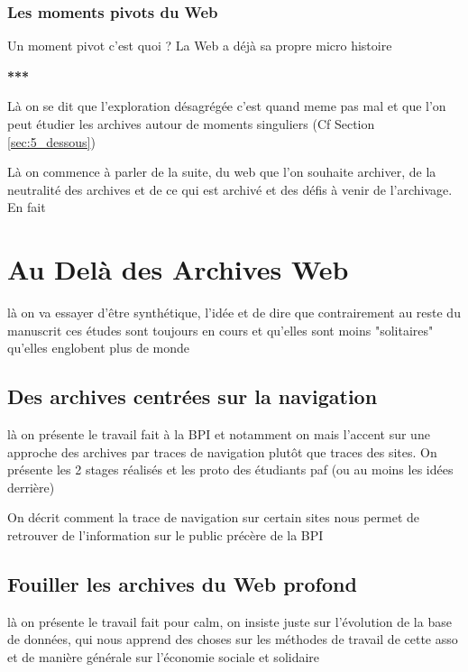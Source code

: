 \documentclass[symmetric,justified,marginals=raggedouter]{tufte-book}
\begin{document}
\subsection{Les moments pivots du Web}

\noindent Un moment pivot c'est quoi ? La Web a déjà sa propre micro histoire 

\begin{center}
	\textbf{***}
\end{center}

\noindent Là on se dit que l'exploration désagrégée c'est quand meme pas mal et que l'on peut étudier les archives autour de moments singuliers (Cf Section \ref{sec:5_dessous})

\noindent Là on commence à parler de la suite, du web que l'on souhaite archiver, de la neutralité des archives et de ce qui est archivé et des défis à venir de l'archivage. En fait 


\chapter{Au Delà des Archives Web}
\label{chap:7}

\noindent là on va essayer d'être synthétique, l'idée et de dire que contrairement au reste du manuscrit ces études sont toujours en cours et qu'elles sont moins "solitaires" qu'elles englobent plus de monde 

\section{Des archives centrées sur la navigation}

\noindent là on présente le travail fait à la BPI et notamment on mais l'accent sur une approche des archives par traces de navigation plutôt que traces des sites. On présente les 2 stages réalisés et les proto des étudiants paf (ou au moins les idées derrière) 

\noindent On décrit comment la trace de navigation sur certain sites nous permet de retrouver de l'information sur le public précère de la BPI

\section{Fouiller les archives du Web profond}

\noindent là on présente le travail fait pour calm, on insiste juste sur l'évolution de la base de données, qui nous apprend des choses sur les méthodes de travail de cette asso et de manière générale sur l'économie sociale et solidaire
\end{document}
